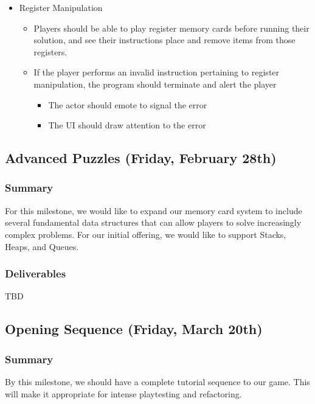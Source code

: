 \begin{itemize}
\begin{itemize}
  \end{itemize}
  \item Register Manipulation
  \begin{itemize}
    \item Players should be able to play register memory cards before running
    their solution, and see their instructions place and remove items from those
    registers.
    \item If the player performs an invalid instruction pertaining to register
    manipulation, the program should terminate and alert the player
    \begin{itemize}
      \item The actor should emote to signal the error
      \item The UI should draw attention to the error
    \end{itemize}
  \end{itemize}
\end{itemize}


\subsection{Advanced Puzzles (Friday, February 28th)}

\subsubsection*{Summary}
For this milestone, we would like to expand our memory card system to include
several fundamental data structures that can allow players to solve increasingly
complex problems. For our initial offering, we would like to support Stacks,
Heaps, and Queues.

\subsubsection*{Deliverables}
TBD

\subsection{Opening Sequence (Friday, March 20th)}

\subsubsection*{Summary}
By this milestone, we should have a complete tutorial sequence to our game. This
will make it appropriate for intense playtesting and refactoring.

